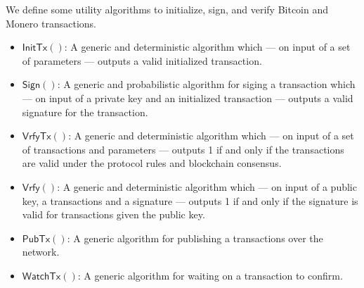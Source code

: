 \documentclass{llncs}
\newcommand{\Sign}{\textsf{Sign}}
\newcommand{\Verify}{\textsf{Vrfy}}
\newcommand{\InitTx}{\textsf{InitTx}}
\newcommand{\VrfyTx}{\textsf{VrfyTx}}
\newcommand{\PubTx}{\textsf{PubTx}}
\newcommand{\WatchTx}{\textsf{WatchTx}}
\begin{document}
We define some utility algorithms to initialize, sign, and verify Bitcoin and Monero transactions.

\begin{itemize}
    \item $\InitTx()$: A generic and deterministic algorithm which --- on input of a set of parameters --- outputs a valid initialized transaction.
    \item $\Sign()$: A generic and probabilistic algorithm for siging a transaction which --- on input of a private key and an initialized transaction --- outputs a valid signature for the transaction.
    \item $\VrfyTx()$: A generic and deterministic algorithm which --- on input of a set of transactions and parameters --- outputs 1 if and only if the transactions are valid under the protocol rules and blockchain consensus.
    \item $\Verify()$: A generic and deterministic algorithm which --- on input of a public key, a transactions and a signature --- outputs 1 if and only if the signature is valid for transactions given the public key.
    \item $\PubTx()$: A generic algorithm for publishing a transactions over the network.
    \item $\WatchTx()$: A generic algorithm for waiting on a transaction to confirm.
\end{itemize}

\newpage
\end{document}
